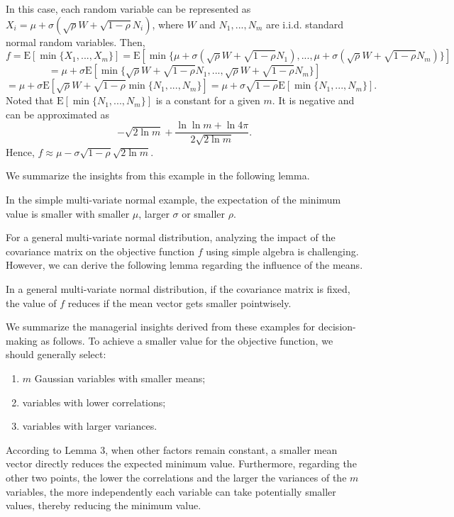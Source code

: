 \documentclass[opre,sglanonrev]{informs4}
\begin{document}
In this case, each random variable can be represented as $X_i = \mu + \sigma(\sqrt{\rho}W + \sqrt{1-\rho} N_i )$, where $W$ and $N_1,...,N_m$ are i.i.d. standard normal random variables. Then,
$$f = \text{E}[\min\{X_1,...,X_m\}] =  \text{E}[\min\{\mu + \sigma(\sqrt{\rho}W + \sqrt{1-\rho} N_1 ),...,\mu + \sigma(\sqrt{\rho}W + \sqrt{1-\rho} N_m )\}] $$
$$=\mu+ \sigma\text{E}[\min\{\sqrt{\rho}W + \sqrt{1-\rho} N_1 ,...,\sqrt{\rho}W + \sqrt{1-\rho} N_m \}]  $$
$$=\mu + \sigma\text{E}[\sqrt{\rho}W+ \sqrt{1-\rho} \min\{N_1,...,N_m\} ] =\mu + \sigma\sqrt{1-\rho} \text{E}[\min\{N_1,...,N_m\} ]. $$
Noted that $\text{E}[\min\{N_1 ,...,N_m \}]$ is a constant for a given $m$. It is negative and can be approximated as 
$$-\sqrt{2 \ln m} + \frac{\ln \ln m + \ln 4\pi}{ 2 \sqrt{2 \ln m}}. $$
Hence, $f\approx \mu - \sigma\sqrt{1-\rho}\sqrt{2 \ln m}$. 

We summarize the insights from this example in the following lemma.

\begin{lemma}
	In the simple multi-variate normal example, the expectation of the minimum value is smaller with smaller $\mu$, larger $\sigma$ or smaller $\rho$.
\end{lemma}

For a general multi-variate normal distribution, analyzing the impact of the covariance matrix on the objective function $   f   $ using simple algebra is challenging. However, we can derive the following lemma regarding the influence of the means.
\begin{lemma}
	In a general multi-variate normal distribution, if the covariance matrix is fixed, the value of $f$ reduces if the mean vector gets smaller pointwisely.
\end{lemma}

We summarize the managerial insights derived from these examples for decision-making as follows. To achieve a smaller value for the objective function, we should generally select: 
\begin{enumerate}
	\item $m$ Gaussian variables with smaller means;
	\item variables with lower correlations;
	\item variables with larger variances.
\end{enumerate}
According to Lemma 3, when other factors remain constant, a smaller mean vector directly reduces the expected minimum value. Furthermore, regarding the other two points, the lower the correlations and the larger the variances of the $m$ variables, the more independently each variable can take potentially smaller values, thereby reducing the minimum value.
\end{document}
